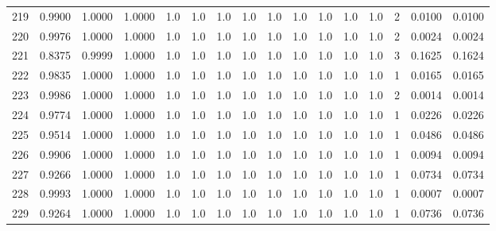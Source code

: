 \begin{tabular}{lrrrrrrrrrrrrrrr}
219 &      0.9900 &  1.0000 &  1.0000 &     1.0 &     1.0 &     1.0 &     1.0 &     1.0 &     1.0 &     1.0 &      1.0 &        1.0 &      2 &                    0.0100 &                     0.0100 \\
220 &      0.9976 &  1.0000 &  1.0000 &     1.0 &     1.0 &     1.0 &     1.0 &     1.0 &     1.0 &     1.0 &      1.0 &        1.0 &      2 &                    0.0024 &                     0.0024 \\
221 &      0.8375 &  0.9999 &  1.0000 &     1.0 &     1.0 &     1.0 &     1.0 &     1.0 &     1.0 &     1.0 &      1.0 &        1.0 &      3 &                    0.1625 &                     0.1624 \\
222 &      0.9835 &  1.0000 &  1.0000 &     1.0 &     1.0 &     1.0 &     1.0 &     1.0 &     1.0 &     1.0 &      1.0 &        1.0 &      1 &                    0.0165 &                     0.0165 \\
223 &      0.9986 &  1.0000 &  1.0000 &     1.0 &     1.0 &     1.0 &     1.0 &     1.0 &     1.0 &     1.0 &      1.0 &        1.0 &      2 &                    0.0014 &                     0.0014 \\
224 &      0.9774 &  1.0000 &  1.0000 &     1.0 &     1.0 &     1.0 &     1.0 &     1.0 &     1.0 &     1.0 &      1.0 &        1.0 &      1 &                    0.0226 &                     0.0226 \\
225 &      0.9514 &  1.0000 &  1.0000 &     1.0 &     1.0 &     1.0 &     1.0 &     1.0 &     1.0 &     1.0 &      1.0 &        1.0 &      1 &                    0.0486 &                     0.0486 \\
226 &      0.9906 &  1.0000 &  1.0000 &     1.0 &     1.0 &     1.0 &     1.0 &     1.0 &     1.0 &     1.0 &      1.0 &        1.0 &      1 &                    0.0094 &                     0.0094 \\
227 &      0.9266 &  1.0000 &  1.0000 &     1.0 &     1.0 &     1.0 &     1.0 &     1.0 &     1.0 &     1.0 &      1.0 &        1.0 &      1 &                    0.0734 &                     0.0734 \\
228 &      0.9993 &  1.0000 &  1.0000 &     1.0 &     1.0 &     1.0 &     1.0 &     1.0 &     1.0 &     1.0 &      1.0 &        1.0 &      1 &                    0.0007 &                     0.0007 \\
229 &      0.9264 &  1.0000 &  1.0000 &     1.0 &     1.0 &     1.0 &     1.0 &     1.0 &     1.0 &     1.0 &      1.0 &        1.0 &      1 &                    0.0736 &                     0.0736 \\

\end{tabular}
